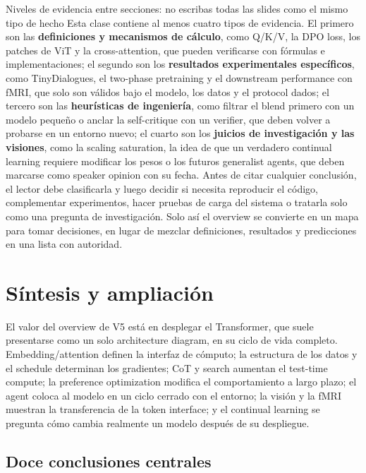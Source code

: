 \documentclass[a4paper]{article}
\begin{document}
\begin{importantbox}{Niveles de evidencia entre secciones: no escribas todas las slides como el mismo tipo de hecho}
Esta clase contiene al menos cuatro tipos de evidencia. El primero son las \textbf{definiciones y mecanismos de cálculo}, como Q/K/V, la DPO loss, los patches de ViT y la cross-attention, que pueden verificarse con fórmulas e implementaciones; el segundo son los \textbf{resultados experimentales específicos}, como TinyDialogues, el two-phase pretraining y el downstream performance con fMRI, que solo son válidos bajo el modelo, los datos y el protocol dados; el tercero son las \textbf{heurísticas de ingeniería}, como filtrar el blend primero con un modelo pequeño o anclar la self-critique con un verifier, que deben volver a probarse en un entorno nuevo; el cuarto son los \textbf{juicios de investigación y las visiones}, como la scaling saturation, la idea de que un verdadero continual learning requiere modificar los pesos o los futuros generalist agents, que deben marcarse como speaker opinion con su fecha. Antes de citar cualquier conclusión, el lector debe clasificarla y luego decidir si necesita reproducir el código, complementar experimentos, hacer pruebas de carga del sistema o tratarla solo como una pregunta de investigación. Solo así el overview se convierte en un mapa para tomar decisiones, en lugar de mezclar definiciones, resultados y predicciones en una lista con autoridad.
\end{importantbox}
\section{Síntesis y ampliación}

El valor del overview de V5 está en desplegar el Transformer, que suele presentarse como un solo architecture diagram, en su ciclo de vida completo. Embedding/attention definen la interfaz de cómputo; la estructura de los datos y el schedule determinan los gradientes; CoT y search aumentan el test-time compute; la preference optimization modifica el comportamiento a largo plazo; el agent coloca al modelo en un ciclo cerrado con el entorno; la visión y la fMRI muestran la transferencia de la token interface; y el continual learning se pregunta cómo cambia realmente un modelo después de su despliegue.

\subsection{Doce conclusiones centrales}
\end{document}
